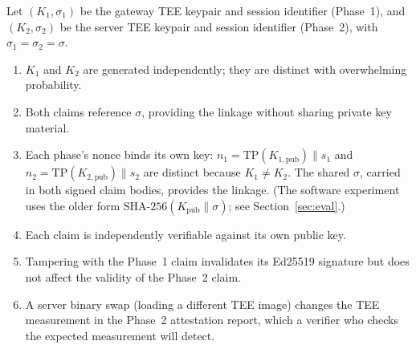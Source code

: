 \begin{property}
\label{prop:cross-org}
Let $(K_1, \sigma_1)$ be the gateway TEE keypair and session identifier (Phase~1), and
$(K_2, \sigma_2)$ be the server TEE keypair and session identifier (Phase~2), with
$\sigma_1 = \sigma_2 = \sigma$.
\begin{enumerate}[leftmargin=1.5em,label=(\alph*)]
  \item $K_1$ and $K_2$ are generated independently; they are distinct with overwhelming
    probability.
  \item Both claims reference $\sigma$, providing the linkage without sharing private key
    material.
  \item Each phase's nonce binds its own key: $n_1 = \text{TP}(K_{1,\text{pub}}) \| s_1$
    and $n_2 = \text{TP}(K_{2,\text{pub}}) \| s_2$ are distinct because $K_1 \neq K_2$.
    The shared $\sigma$, carried in both signed claim bodies, provides the linkage. (The
    software experiment uses the older form $\text{SHA-256}(K_{\text{pub}} \| \sigma)$; see
    Section~\ref{sec:eval}.)
  \item Each claim is independently verifiable against its own public key.
  \item Tampering with the Phase~1 claim invalidates its Ed25519 signature but does not
    affect the validity of the Phase~2 claim.
  \item A server binary swap (loading a different TEE image) changes the TEE measurement
    in the Phase~2 attestation report, which a verifier who checks the expected measurement
    will detect.
\end{enumerate}
\end{property}
